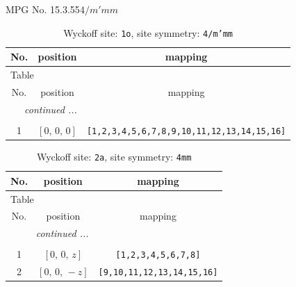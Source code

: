 \documentclass[fleqn,8pt]{jsarticle}
\begin{document}
\setcounter{MaxMatrixCols}{32}

\renewcommand{\tablename}{Table~}
\renewcommand{\figurename}{Figure~}
\begin{center}
\LARGE
MPG No. 15.3.55\quad$4/m'mm$
\end{center}
\renewcommand{\arraystretch}{1.2}
\begin{longtable}{ccc}
\caption{Wyckoff site: {\tt 1o}, site symmetry: {\tt 4/m'mm}}
 \\
 \hline \hline
No. & position & mapping \\ \hline \endfirsthead

\multicolumn{2}{l}{\tablename\ \thetable{}} \\
 \hline \hline
No. & position & mapping \\ \hline \endhead

 \hline \hline
\multicolumn{2}{r}{\footnotesize\it continued ...} \\ \endfoot

 \hline \hline
\multicolumn{2}{r}{} \\ \endlastfoot

1 & $\left[ 0,\, 0,\, 0 \right]$ & {\tt [1,2,3,4,5,6,7,8,9,10,11,12,13,14,15,16]} \\
\end{longtable}
\renewcommand{\arraystretch}{1.2}
\begin{longtable}{ccc}
\caption{Wyckoff site: {\tt 2a}, site symmetry: {\tt 4mm}}
 \\
 \hline \hline
No. & position & mapping \\ \hline \endfirsthead

\multicolumn{2}{l}{\tablename\ \thetable{}} \\
 \hline \hline
No. & position & mapping \\ \hline \endhead

 \hline \hline
\multicolumn{2}{r}{\footnotesize\it continued ...} \\ \endfoot

 \hline \hline
\multicolumn{2}{r}{} \\ \endlastfoot

1 & $\left[ 0,\, 0,\, z \right]$ & {\tt [1,2,3,4,5,6,7,8]} \\ \hline
2 & $\left[ 0,\, 0,\, - z \right]$ & {\tt [9,10,11,12,13,14,15,16]} \\
\end{longtable}
\renewcommand{\arraystretch}{1.2}
\end{document}
